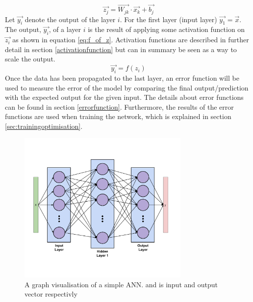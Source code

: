 \begin{equation}\label{eq:z}
    \vec{z_j} = \vec{W_{jk}} \cdot \vec{x_k} + \vec{b_j}
\end{equation}
Let $\vec{y_i}$ denote the output of the layer $i$. For the first layer (input layer) $\vec{y_1}=\vec{x}$. The output, $\vec{y_i}$, of a layer $i$ is the result of applying some activation function on $\vec{z_i}$ as shown in equation \ref{eq:f_of_z}. Activation functions are described in further detail in section \ref{activationfunction} but can in summary be seen as a way to scale the output.
\begin{equation}\label{eq:f_of_z}
    \vec{y_i} = f(z_i)
\end{equation}
Once the data has been propagated to the last layer, an error function will be used to measure the error of the model by comparing the final output/prediction with the expected output for the given input. The details about error functions can be found in section \ref{errorfunction}. Furthermore, the results of the error functions are used when training the network, which is explained in section \ref{sec:trainingoptimisation}. 

\begin{figure}[h]
    \centering
    \includegraphics[width=0.75\textwidth]{figure/ann/simple_ann}
    \caption{A graph visualisation of a simple ANN.  and  is input and output vector respectivly}
    \label{fig:simple_ann}
\end{figure}

